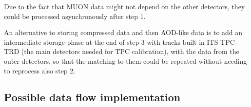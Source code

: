 Due to the fact that MUON data might not depend on the other detectors, they could be processed asynchronously after step 1.

An alternative to storing compressed data and then AOD-like data is to add an intermediate storage phase at the end
of step 3 with tracks built in ITS-TPC-TRD (the main detectors needed for TPC calibration), with the data from the 
outer detectors, so that the matching to them could be repeated without needing to reprocess also step 2.
 

\subsection{Possible data flow implementation}
  




















